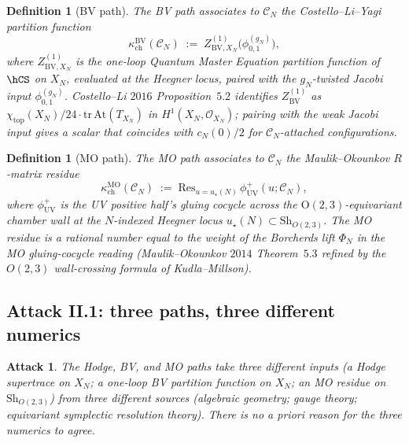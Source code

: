 \documentclass[11pt]{amsart}
\newtheorem{definition}[theorem]{Definition}
\newtheorem{attack}[theorem]{Attack}
\providecommand{\cC}{\mathcal{C}}
\providecommand{\cO}{\mathcal{O}}
\providecommand{\At}{\mathrm{At}}
\providecommand{\BV}{\mathrm{BV}}
\providecommand{\MO}{\mathrm{MO}}
\providecommand{\kch}{\kappa_{\mathrm{ch}}}
\begin{document}
\begin{definition}[BV path]
\label{def:bv-path}
The \emph{BV path} associates to $\cC_N$ the Costello--Li--Yagi
partition function
\[
 \kch^{\BV}(\cC_N) \;:=\; Z_{\BV, X_N}^{(1)}\bigl(\phi_{0, 1}^{(g_N)}\bigr),
\]
where $Z_{\BV, X_N}^{(1)}$ is the one-loop Quantum Master Equation
partition function of $\hCS$ on $X_N$, evaluated at the Heegner locus,
paired with the $g_N$-twisted Jacobi input $\phi_{0, 1}^{(g_N)}$.
Costello--Li $2016$ Proposition~$5.2$ identifies $Z_{\BV}^{(1)}$ as
$\chi_{\mathrm{top}}(X_N)/24 \cdot \mathrm{tr}\,\At(T_{X_N})$ in
$H^1(X_N, \cO_{X_N})$; pairing with the weak Jacobi input gives a
scalar that coincides with $c_N(0)/2$ for $\cC_N$-attached
configurations.
\end{definition}

\begin{definition}[MO path]
\label{def:mo-path}
The \emph{MO path} associates to $\cC_N$ the Maulik--Okounkov
$R$-matrix residue
\[
 \kch^{\MO}(\cC_N) \;:=\; \mathrm{Res}_{u = u_\star(N)}\, \phi^+_{\mathrm{UV}}(u; \cC_N),
\]
where $\phi^+_{\mathrm{UV}}$ is the UV positive half's gluing cocycle
across the $\mathrm{O}(2, 3)$-equivariant chamber wall at the
$N$-indexed Heegner locus $u_\star(N) \subset \mathrm{Sh}_{O(2, 3)}$.
The MO residue is a rational number equal to the weight of the
Borcherds lift $\Phi_N$ in the MO gluing-cocycle reading
(Maulik--Okounkov $2014$ Theorem~$5.3$ refined by the $O(2, 3)$
wall-crossing formula of Kudla--Millson).
\end{definition}

\subsection{Attack II.1: three paths, three different numerics}

\begin{attack}
\label{att:three-different-numerics}
The Hodge, BV, and MO paths take three different inputs (a Hodge
supertrace on $X_N$; a one-loop BV partition function on $X_N$; an
MO residue on $\mathrm{Sh}_{O(2, 3)}$) from three different sources
(algebraic geometry; gauge theory; equivariant symplectic resolution
theory). There is no a priori reason for the three numerics to
agree.
\end{attack}
\end{document}
